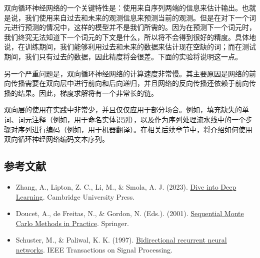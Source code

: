 双向循环神经网络的一个关键特性是：使用来自序列两端的信息来估计输出。也就是说，我们使用来自过去和未来的观测信息来预测当前的观测。但是在对下一个词元进行预测的情况中，这样的模型并不是我们所需的。因为在预测下一个词元时，我们终究无法知道下一个词元的下文是什么，所以将不会得到很好的精度。具体地说，在训练期间，我们能够利用过去和未来的数据来估计现在空缺的词；而在测试期间，我们只有过去的数据，因此精度将会很差。下面的实验将说明这一点。

另一个严重问题是，双向循环神经网络的计算速度非常慢。其主要原因是网络的前向传播需要在双向层中进行前向和后向递归，并且网络的反向传播还依赖于前向传播的结果。因此，梯度求解将有一个非常长的链。

双向层的使用在实践中非常少，并且仅仅应用于部分场合。例如，填充缺失的单词、词元注释（例如，用于命名实体识别），以及作为序列处理流水线中的一个步骤对序列进行编码（例如，用于机器翻译）。在相关后续章节中，将介绍如何使用双向循环神经网络编码文本序列。

\FloatBarrier
{}
\hypertarget{ux53c2ux8003ux6587ux732e-23}{%
\subsection{参考文献}\label{ux53c2ux8003ux6587ux732e-23}}

\vspace{0.25em}
\begin{itemize}
\tightlist
\item
  Zhang, A., Lipton, Z. C., Li, M., \& Smola, A. J. (2023). \href{https://D2L.ai}{Dive into Deep Learning}. Cambridge University Press.
\item
  Doucet, A., de Freitas, N., \& Gordon, N. (Eds.). (2001). \href{https://doi.org/10.1007/978-1-4757-3437-9}{Sequential Monte Carlo Methods in Practice}. Springer.
\item
  Schuster, M., \& Paliwal, K. K. (1997). \href{https://doi.org/10.1109/78.650093}{Bidirectional recurrent neural networks}. IEEE Transactions on Signal Processing.
\end{itemize}

\clearpage
